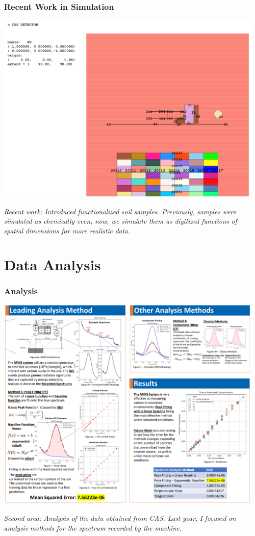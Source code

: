 \documentclass[notheorems,11pt,compress]{beamer}
\begin{document}
\begin{frame}
\frametitle{Recent Work in Simulation}
\begin{center}
\includegraphics[width=0.7\linewidth]{7x7x7inmcnp.png}
\end{center}
\small
\textit{Recent work: Introduced functionalized soil samples. Previously, samples were simulated as chemically even; now, we simulate them as digitized functions of spatial dimensions for more realistic data.}
\end{frame}

\section{Data Analysis}

\begin{frame}
\frametitle{Analysis}
\begin{center}
\includegraphics[width=0.7\linewidth]{analysismethods.png}
\end{center}
\small
\textit{Second area: Analysis of the data obtained from CAS. Last year, I focused on analysis methods for the spectrum recorded by the machine.}
\end{frame}
\end{document}

